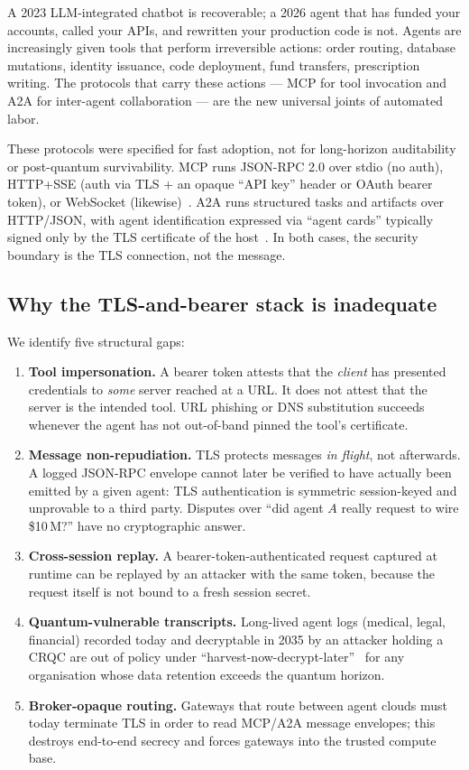 \documentclass[11pt,a4paper]{article}
\theoremstyle{definition}
\theoremstyle{remark}
\newcommand{\mcp}{\textsf{MCP}\xspace}
\newcommand{\aatwo}{\textsf{A2A}\xspace}
\begin{document}
A 2023 LLM-integrated chatbot is recoverable; a 2026 agent that has
funded your accounts, called your APIs, and rewritten your production
code is not. Agents are increasingly given tools that perform irreversible
actions: order routing, database mutations, identity issuance, code
deployment, fund transfers, prescription writing. The protocols that
carry these actions --- \mcp{} for tool invocation and \aatwo{} for
inter-agent collaboration --- are the new universal joints of automated
labor.

These protocols were specified for fast adoption, not for long-horizon
auditability or post-quantum survivability. \mcp{} runs JSON-RPC 2.0 over
stdio (no auth), HTTP+SSE (auth via TLS + an opaque ``API key'' header or
OAuth bearer token), or WebSocket (likewise)~\cite{mcp2024,jsonrpc2}.
\aatwo{} runs structured tasks and artifacts over HTTP/JSON, with agent
identification expressed via ``agent cards'' typically signed only by the
TLS certificate of the host~\cite{a2a2025}. In both cases, the security
boundary is the TLS connection, not the message.

\subsection{Why the TLS-and-bearer stack is inadequate}

We identify five structural gaps:

\begin{enumerate}[leftmargin=2em,itemsep=0.25em]
\item \textbf{Tool impersonation.} A bearer token attests that the
\emph{client} has presented credentials to \emph{some} server reached at
a URL. It does not attest that the server is the intended tool. URL
phishing or DNS substitution succeeds whenever the agent has not
out-of-band pinned the tool's certificate.
\item \textbf{Message non-repudiation.} TLS protects messages
\emph{in flight}, not afterwards. A logged JSON-RPC envelope cannot
later be verified to have actually been emitted by a given agent: TLS
authentication is symmetric session-keyed and unprovable to a third
party. Disputes over ``did agent $A$ really request to wire \$10\,M?''
have no cryptographic answer.
\item \textbf{Cross-session replay.} A bearer-token-authenticated request
captured at runtime can be replayed by an attacker with the same token,
because the request itself is not bound to a fresh session secret.
\item \textbf{Quantum-vulnerable transcripts.} Long-lived agent logs
(medical, legal, financial) recorded today and decryptable in 2035 by an
attacker holding a CRQC are out of policy under
``harvest-now-decrypt-later''~\cite{harvest_now} for any organisation
whose data retention exceeds the quantum horizon.
\item \textbf{Broker-opaque routing.} Gateways that route between agent
clouds must today terminate TLS in order to read \mcp{}/\aatwo{}
message envelopes; this destroys end-to-end secrecy and forces gateways
into the trusted compute base.
\end{enumerate}
\end{document}
